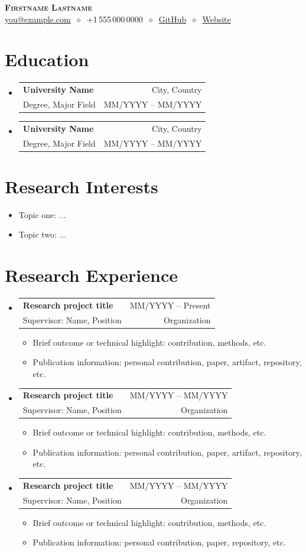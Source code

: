 \documentclass[letterpaper,11pt]{article}
\makeatletter
\newcommand{\cvitem}[1]{
  \item\small{
    {#1\vspace{-2pt}}
  }
}
\newcommand{\cvheading}[4]{
  \vspace{-2pt}\item
    \begin{tabular*}{\textwidth}[t]{l@{\extracolsep{\fill}}r}
      \textbf{#1} & #2 \\
      \small#3 & \small #4 \\
    \end{tabular*}\vspace{-7pt}
}
\newcommand{\cvheadingstart}{\begin{itemize}[leftmargin=0in, label={}]}
\newcommand{\cvheadingend}{\end{itemize}}
\newcommand{\cvitemstart}{\begin{itemize}[label=\textopenbullet]\justifying}
\newcommand{\cvitemend}{\end{itemize}\vspace{-5pt}}
\makeatother
\begin{document}
\begin{center}
  \textbf{\LARGE\scshape Firstname Lastname} \\
  \vspace{1pt}\small
  \href{mailto:you@example.com}{you@example.com}
  $\ \diamond\ $
  +1\,555\,000\,0000
  $\ \diamond\ $
  \href{https://github.com/yourusername}{GitHub}
  $\ \diamond\ $
  \href{https://your-site.example}{Website}
\end{center}


\section{Education}
\cvheadingstart
  \cvheading
    {University Name}{City, Country}
    {Degree, Major Field}{MM/YYYY -- MM/YYYY}
\cvheadingend

\cvheadingstart
  \cvheading
    {University Name}{City, Country}
    {Degree, Major Field}{MM/YYYY -- MM/YYYY}
\cvheadingend


\section{Research Interests}
\begin{itemize}
  \setlength{\itemsep}{0pt}
  \item Topic one: ...
  \item Topic two: ...
\end{itemize}


\section{Research Experience}
\cvheadingstart
  \cvheading
    {Research project title}{MM/YYYY -- Present}
    {Supervisor: Name, Position}{Organization}
  \cvitemstart
    \cvitem{Brief outcome or technical highlight: contribution, methods, etc.}
    \cvitem{Publication information: personal contribution, paper, artifact, repository, etc.}
  \cvitemend
\cvheadingend

\cvheadingstart
  \cvheading
    {Research project title}{MM/YYYY -- MM/YYYY}
    {Supervisor: Name, Position}{Organization}
  \cvitemstart
    \cvitem{Brief outcome or technical highlight: contribution, methods, etc.}
    \cvitem{Publication information: personal contribution, paper, artifact, repository, etc.}
  \cvitemend
\cvheadingend

\cvheadingstart
  \cvheading
    {Research project title}{MM/YYYY -- MM/YYYY}
    {Supervisor: Name, Position}{Organization}
  \cvitemstart
    \cvitem{Brief outcome or technical highlight: contribution, methods, etc.}
    \cvitem{Publication information: personal contribution, paper, repository, etc.}
  \cvitemend
\cvheadingend
\end{document}
